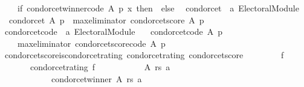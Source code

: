 \begin{isabellebody}
\ \ \ \ {\isacharparenleft}{\kern0pt}if\ {\isacharparenleft}{\kern0pt}condorcet{\isacharunderscore}{\kern0pt}winner{\isacharunderscore}{\kern0pt}code\ A\ p\ x{\isacharparenright}{\kern0pt}\ then\ {}\ else\ {}{\isacharparenright}{\kern0pt}{\isachardoublequoteclose}\isanewline
\isanewline
{}\isamarkupfalse%
\ condorcet\ {\isacharcolon}{\kern0pt}{\isacharcolon}{\kern0pt}\ {\isachardoublequoteopen}{\isacharprime}{\kern0pt}a\ Electoral{\isacharunderscore}{\kern0pt}Module{\isachardoublequoteclose}\ \isanewline
\ \ {\isachardoublequoteopen}condorcet\ A\ p\ {\isacharequal}{\kern0pt}\ {\isacharparenleft}{\kern0pt}max{\isacharunderscore}{\kern0pt}eliminator\ condorcet{\isacharunderscore}{\kern0pt}score{\isacharparenright}{\kern0pt}\ A\ p{\isachardoublequoteclose}\isanewline
\isanewline
{}\isamarkupfalse%
\ condorcet{\isacharunderscore}{\kern0pt}code\ {\isacharcolon}{\kern0pt}{\isacharcolon}{\kern0pt}\ {\isachardoublequoteopen}{\isacharprime}{\kern0pt}a\ Electoral{\isacharunderscore}{\kern0pt}Module{\isachardoublequoteclose}\ \isanewline
\ \ {\isachardoublequoteopen}condorcet{\isacharunderscore}{\kern0pt}code\ A\ p\ {\isacharequal}{\kern0pt}\isanewline
\ \ \ \ {\isacharparenleft}{\kern0pt}max{\isacharunderscore}{\kern0pt}eliminator\ condorcet{\isacharunderscore}{\kern0pt}score{\isacharunderscore}{\kern0pt}code{\isacharparenright}{\kern0pt}\ A\ p{\isachardoublequoteclose}%
\isadelimdocument
%
\endisadelimdocument
%
\isatagdocument
%
\isamarkuptrue%
%
\endisatagdocument
{\isafolddocument}%
%
\isadelimdocument
%
\endisadelimdocument
{}\isamarkupfalse%
\ condorcet{\isacharunderscore}{\kern0pt}score{\isacharunderscore}{\kern0pt}is{\isacharunderscore}{\kern0pt}condorcet{\isacharunderscore}{\kern0pt}rating{\isacharcolon}{\kern0pt}\ {\isachardoublequoteopen}condorcet{\isacharunderscore}{\kern0pt}rating\ condorcet{\isacharunderscore}{\kern0pt}score{\isachardoublequoteclose}\isanewline
%
\isadelimproof
%
\endisadelimproof
%
\isatagproof
{}\isamarkupfalse%
\ {\isacharminus}{\kern0pt}\isanewline
\ \ \isamarkupfalse%
\isanewline
\ \ \ \ {\isachardoublequoteopen}{\isasymforall}f{\isachardot}{\kern0pt}\isanewline
\ \ \ \ \ \ {\isacharparenleft}{\kern0pt}{\isasymnot}\ condorcet{\isacharunderscore}{\kern0pt}rating\ f\ {\isasymlongrightarrow}\isanewline
\ \ \ \ \ \ \ \ \ \ {\isacharparenleft}{\kern0pt}{\isasymexists}A\ rs\ a{\isachardot}{\kern0pt}\isanewline
\ \ \ \ \ \ \ \ \ \ \ \ condorcet{\isacharunderscore}{\kern0pt}winner\ A\ rs\ a\ {\isasymand}\isanewline

\end{isabellebody}
